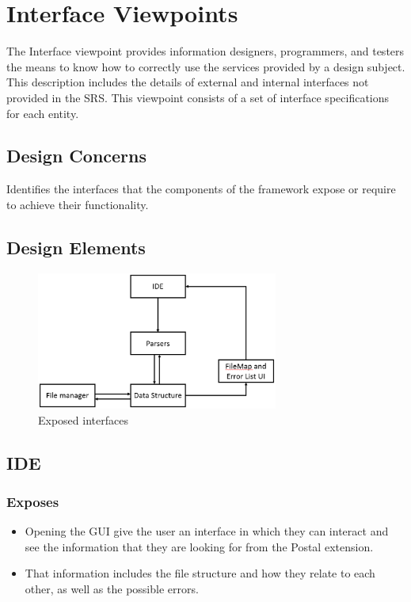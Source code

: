 \documentclass[letterpaper,10pt,titlepage,draftclsnofoot,onecolumn,onesided] {IEEEtran}
\begin{document}
		
		
\section{Interface Viewpoints}
The Interface viewpoint provides information designers, programmers, and testers the means to know how
to correctly use the services provided by a design subject. This description includes the details of external
and internal interfaces not provided in the SRS. This viewpoint consists of a set of interface specifications
for each entity. 
\subsection{Design Concerns}
Identifies the interfaces that the components of the framework expose or require to achieve their
functionality. 
\subsection{Design Elements}

		\begin{figure}
                 \includegraphics[width=300px]{InterfaceUMLEPS.eps}
                 \caption{Exposed interfaces}
      		\end{figure}

	\subsection{IDE}
		\subsubsection{Exposes}
			\begin{itemize}
			\item Opening the GUI give the user an interface in which they can interact and see the information that they are looking for from the Postal extension.
			\item That information includes the file structure and how they relate to each other, as well as the possible errors. 
			\end{itemize}
\end{document}
